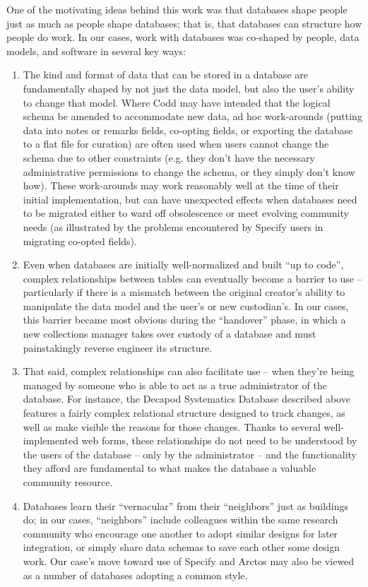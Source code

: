 One of the motivating ideas behind this work was that databases shape people just as much as people shape databases; that is, that databases can structure how people do work. In our cases, work with databases was co-shaped by people, data models, and software in several key ways: 
\begin{enumerate}
\item The kind and format of data that can be stored in a database are fundamentally shaped by not just the data model, but also the user’s ability to change that model. Where Codd may have intended that the logical schema be amended to accommodate new data, ad hoc work-arounds (putting data into notes or remarks fields, co-opting fields, or exporting the database to a flat file for curation) are often used when users cannot change the schema due to other constraints (e.g. they don't have the necessary administrative permissions to change the schema, or they simply don't know how). These work-arounds may work reasonably well at the time of their initial implementation, but can have unexpected effects when databases need to be migrated either to ward off obsolescence or meet evolving community needs (as illustrated by the problems encountered by Specify users in migrating co-opted fields). 
\item Even when databases are initially well-normalized and built “up to code”, complex relationships between tables can eventually become a barrier to use – particularly if there is a mismatch between the original creator’s ability to manipulate the data model and the user’s or new custodian’s. In our cases, this barrier became most obvious during the “handover” phase, in which a new collections manager takes over custody of a database and must painstakingly reverse engineer its structure. 
\item That said, complex relationships can also facilitate use -- when they’re being managed by someone who is able to act as a true administrator of the database. For instance, the Decapod Systematics Database described above features a fairly complex relational structure designed to track changes, as well as make visible the reasons for those changes. Thanks to several well-implemented web forms, these relationships do not need to be understood by the users of the database – only by the administrator -- and the functionality they afford are fundamental to what makes the database a valuable community resource.
\item Databases learn their “vernacular” from their “neighbors” just as buildings do; in our cases, “neighbors” include colleagues within the same research community who encourage one another to adopt similar designs for later integration, or simply share data schemas to save each other some design work. Our case’s move toward use of Specify and Arctos may also be viewed as a number of databases adopting a common style. 

\end{enumerate}
